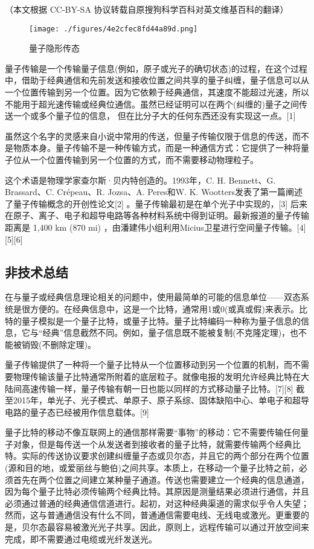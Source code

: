 
（本文根据 CC-BY-SA 协议转载自原搜狗科学百科对英文维基百科的翻译）

\begin{figure}[ht]
\centering
\texttt{[image: ./figures/4e2cfec8fd44a89d.png]}
\caption{量子隐形传态} \label{fig_LZYXCT_1}
\end{figure}

量子传输是一个传输量子信息(例如，原子或光子的确切状态)的过程，在这个过程中，借助于经典通信和先前发送和接收位置之间共享的量子纠缠，量子信息可以从一个位置传输到另一个位置。因为它依赖于经典通信，其速度不能超过光速，所以不能用于超光速传输或经典位通信。虽然已经证明可以在两个(纠缠的)量子之间传送一个或多个量子位的信息， 但在比分子大的任何东西还没有实现这一点。[1]

虽然这个名字的灵感来自小说中常用的传送，但量子传输仅限于信息的传送，而不是物质本身。量子传输不是一种传输方式，而是一种通信方式：它提供了一种将量子位从一个位置传输到另一个位置的方式，而不需要移动物理粒子。

这个术语是物理学家查尔斯·贝内特创造的。1993年，C. H. Bennett、G. Brassard、C. Crépeau、R. Jozsa、A. Peres和W. K. Wootters发表了第一篇阐述了量子传输概念的开创性论文[2] 。量子传输最初是在单个光子中实现的，[3] 后来在原子、离子、电子和超导电路等各种材料系统中得到证明。最新报道的量子传输距离是 1,400 km (870 mi) ，由潘建伟小组利用Micius卫星进行空间量子传输。[4][5][6]

\subsection{非技术总结}

在与量子或经典信息理论相关的问题中，使用最简单的可能的信息单位——双态系统是很方便的。在经典信息中，这是一个比特，通常用1或0(或真或假)来表示。比特的量子模拟是一个量子比特，或量子比特。量子比特编码一种称为量子信息的信息，它与“经典”信息截然不同。例如，量子信息既不能被复制(不克隆定理)，也不能被销毁(不删除定理)。

量子传输提供了一种将一个量子比特从一个位置移动到另一个位置的机制，而不需要物理传输该量子比特通常所附着的底层粒子。就像电报的发明允许经典比特在大陆间高速传输一样，量子传输有朝一日也能以同样的方式移动量子比特。[7][8] 截至2015年，单光子、光子模式、单原子、原子系综、固体缺陷中心、单电子和超导电路的量子态已经被用作信息载体。[9]

量子比特的移动不像互联网上的通信那样需要“事物”的移动：它不需要传输任何量子对象，但是每传送一个从发送者到接收者的量子比特，就需要传输两个经典比特。实际的传送协议要求创建纠缠量子态或贝尔态，并且它的两个部分在两个位置(源和目的地，或爱丽丝与鲍伯)之间共享。本质上，在移动一个量子比特之前，必须首先在两个位置之间建立某种量子通道。传送也需要建立一个经典的信息通道，因为每个量子比特必须传输两个经典比特。其原因是测量结果必须进行通信，并且必须通过普通的经典通信信道进行。起初，对这种经典渠道的需求似乎令人失望；然而，这与普通通信没有什么不同，普通通信需要电线、无线电或激光。更重要的是，贝尔态最容易被激光光子共享。因此，原则上，远程传输可以通过开放空间来完成，即不需要通过电缆或光纤发送光。


